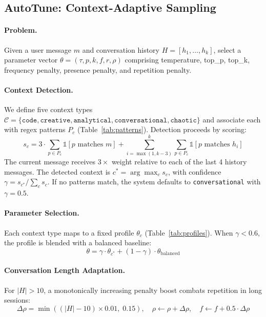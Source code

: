 \documentclass[11pt]{article}
\begin{document}
\subsection{AutoTune: Context-Adaptive Sampling}
\label{sec:autotune}

\paragraph{Problem.} Given a user message $m$ and conversation history $H = [h_1, \ldots, h_k]$, select a parameter vector $\theta = (\tau, p, k, f, r, \rho)$ comprising temperature, top\_p, top\_k, frequency penalty, presence penalty, and repetition penalty.

\paragraph{Context Detection.} We define five context types $\mathcal{C} = \{\texttt{code}, \texttt{creative}, \texttt{analytical}, \texttt{conversational}, \texttt{chaotic}\}$ and associate each with regex patterns $P_c$ (Table~\ref{tab:patterns}). Detection proceeds by scoring:
\begin{equation}
    s_c = 3 \cdot \sum_{p \in P_c} \mathbb{1}[p \text{ matches } m] + \sum_{i=\max(1,k-3)}^{k} \sum_{p \in P_c} \mathbb{1}[p \text{ matches } h_i]
    \label{eq:context_score}
\end{equation}
The current message receives $3\times$ weight relative to each of the last 4 history messages. The detected context is $c^* = \arg\max_c s_c$, with confidence $\gamma = s_{c^*} / \sum_c s_c$. If no patterns match, the system defaults to \texttt{conversational} with $\gamma = 0.5$.

\paragraph{Parameter Selection.} Each context type maps to a fixed profile $\theta_c$ (Table~\ref{tab:profiles}). When $\gamma < 0.6$, the profile is blended with a balanced baseline:
\begin{equation}
    \theta = \gamma \cdot \theta_{c^*} + (1 - \gamma) \cdot \theta_{\text{balanced}}
\end{equation}

\paragraph{Conversation Length Adaptation.} For $|H| > 10$, a monotonically increasing penalty boost combats repetition in long sessions:
\begin{equation}
    \Delta\rho = \min((|H| - 10) \times 0.01,\; 0.15), \quad
    \rho \leftarrow \rho + \Delta\rho, \quad
    f \leftarrow f + 0.5 \cdot \Delta\rho
\end{equation}
\end{document}
